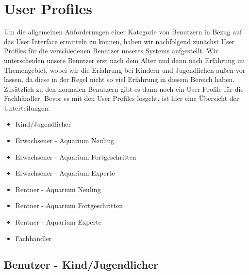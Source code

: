 \chapter{User Profiles}

Um die allgemeinen Anforderungen einer Kategorie von Benutzern in Bezug auf das User Interface ermitteln zu können, haben wir nachfolgend zunächst User Profiles für die verschiedenen Benutzer unseres Systems aufgestellt. Wir unterscheiden unsere Benutzer erst nach dem Alter und dann nach Erfahrung im Themengebiet, wobei wir die Erfahrung bei Kindern und Jugendlichen außen vor lassen, da diese in der Regel nicht so viel Erfahrung in diesem Bereich haben. Zusätzlich zu den normalen Benutzern gibt es dann noch ein User Profile für die Fachhändler. Bevor es mit den User Profiles losgeht, ist hier eine Übersicht der Unterteilungen:

\begin{itemize}
\item Kind/Jugendlicher
\item Erwachsener - Aquarium Neuling
\item Erwachsener - Aquarium Fortgeschritten
\item Erwachsener - Aquarium Experte
\item Rentner - Aquarium Neuling
\item Rentner - Aquarium Fortgeschritten
\item Rentner - Aquarium Experte
\item Fachhändler
\end{itemize}

\renewcommand{\title}{Benutzer - Kind/Jugendlicher}
\section{\title}

